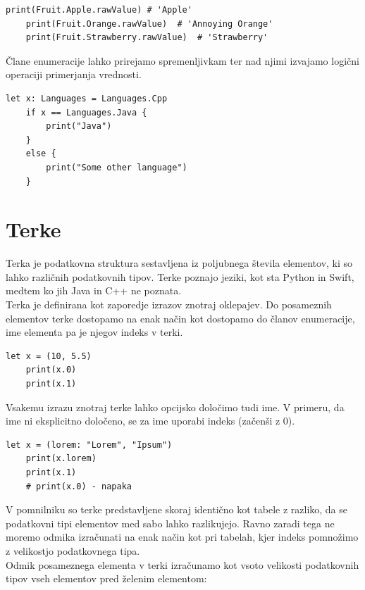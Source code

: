\documentclass[a4paper, 12p]{book}
\begin{document}
\begin{lstlisting}[caption={Primer dostopa do elementov enumeracije ~\ref{lst:fruitEnumeration}.}, captionpos=b]
	print(Fruit.Apple.rawValue) # 'Apple'
	print(Fruit.Orange.rawValue)  # 'Annoying Orange'
	print(Fruit.Strawberry.rawValue)  # 'Strawberry'
\end{lstlisting}

Člane enumeracije lahko prirejamo spremenljivkam ter nad njimi izvajamo logični operaciji primerjanja vrednosti. 

\begin{lstlisting}[caption={}, captionpos=b]
	let x: Languages = Languages.Cpp
	if x == Languages.Java {
	    print("Java")
	}
	else {
	    print("Some other language")
	}
\end{lstlisting}

\section{Terke}

Terka je podatkovna struktura sestavljena iz poljubnega števila elementov, ki so lahko različnih podatkovnih tipov. Terke poznajo jeziki, kot sta Python in Swift, medtem ko jih Java in C++ ne poznata.\\
\indent Terka je definirana kot zaporedje izrazov znotraj oklepajev. Do posameznih elementov terke dostopamo na enak način kot dostopamo do članov enumeracije, ime elementa pa je njegov indeks v terki. 

\begin{lstlisting}[caption={Terka, sestavljena iz dveh vrednosti (Int, Double).}, captionpos=b]
	let x = (10, 5.5)
	print(x.0)
	print(x.1)
\end{lstlisting}

Vsakemu izrazu znotraj terke lahko opcijsko določimo tudi ime. V primeru, da ime ni eksplicitno določeno, se za ime uporabi indeks (začenši z 0).

\begin{lstlisting}[caption={Terka s poimenovanim elementom.}, captionpos=b]
	let x = (lorem: "Lorem", "Ipsum")
	print(x.lorem)
	print(x.1)
	# print(x.0) - napaka
\end{lstlisting}

\indent V pomnilniku so terke predstavljene skoraj identično kot tabele z razliko, da se podatkovni tipi elementov med sabo lahko razlikujejo. Ravno zaradi tega ne moremo odmika izračunati na enak način kot pri tabelah, kjer indeks pomnožimo z velikostjo podatkovnega tipa. \\
\indent Odmik posameznega elementa v terki izračunamo kot vsoto velikosti podatkovnih tipov vseh elementov pred želenim elementom:
\end{document}
